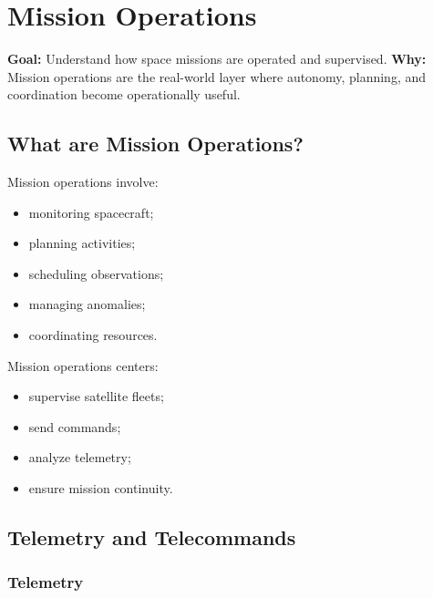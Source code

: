 \documentclass[10pt,a4paper,twocolumn]{article}
\newcommand{\lesson}[3]{
\section{#1}
\noindent
\textbf{Goal:} #2 \newline
\textbf{Why:} #3
\vspace{0.1em}
}
\begin{document}


\lesson
{Mission Operations}
{Understand how space missions are operated and supervised.}
{Mission operations are the real-world layer where autonomy, planning, and coordination become operationally useful.}


\subsection{What are Mission Operations?}

Mission operations involve:
\begin{itemize}
    \item monitoring spacecraft;
    \item planning activities;
    \item scheduling observations;
    \item managing anomalies;
    \item coordinating resources.
\end{itemize}

Mission operations centers:
\begin{itemize}
    \item supervise satellite fleets;
    \item send commands;
    \item analyze telemetry;
    \item ensure mission continuity.
\end{itemize}


\subsection{Telemetry and Telecommands}


\subsubsection*{Telemetry}
\end{document}
